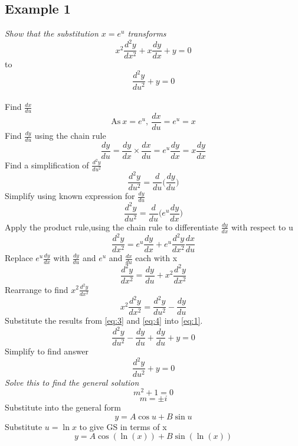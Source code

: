 \documentclass{article}[18pt]
\begin{document}
\subsection{Example 1}
\textit{Show that the substitution $x=e^u$ transforms}
\begin{equation}\label{eq:1}
x^2\frac{d^2y}{dx^2}+x\frac{dy}{dx}+y=0
\end{equation}
to
\begin{equation}\label{eq:2}
\frac{d^2y}{du^2}+y=0
\end{equation}
\\
Find $\frac{dx}{du}$
$$\textrm{As} \ x=e^u, \ \frac{dx}{du}=e^u=x$$
Find $\frac{dy}{du}$ using the chain rule
\begin{equation}\label{eq:3}
\frac{dy}{du}=\frac{dy}{dx}\times\frac{dx}{du}=e^u\frac{dy}{dx}=x\frac{dy}{dx}
\end{equation}
Find a simplification of $\frac{d^2y}{du^2}$
$$\frac{d^2y}{du^2}=\frac{d}{du}\Bigg(\frac{dy}{du}\Bigg)$$
Simplify using known expression for $\frac{dy}{du}$
$$\frac{d^2y}{du^2}=\frac{d}{du}\Bigg(e^u\frac{dy}{dx}\Bigg)$$
Apply the product rule,using the chain rule to differentiate $\frac{dy}{dx}$ with respect to u
$$\frac{d^2y}{dx^2}=e^u\frac{dy}{dx}+e^u\frac{d^2y}{dx^2}\frac{dx}{du}$$
Replace $e^u\frac{dy}{dx}$ with $\frac{dy}{du}$ and $e^u$ and $\frac{dx}{du}$ each with x
$$\frac{d^2y}{dx^2}=\frac{dy}{du}+x^2\frac{d^2y}{dx^2}$$
Rearrange to find $x^2\frac{d^2y}{dx^2}$
\begin{equation}\label{eq:4}
x^2\frac{d^2y}{dx^2}=\frac{d^2y}{du^2}-\frac{dy}{du}
\end{equation}
Substitute the results from \eqref{eq:3} and \eqref{eq:4} into \eqref{eq:1}.
$$\frac{d^2y}{du^2}-\frac{dy}{du}+\frac{dy}{du}+y=0$$
Simplify to find answer
$$\frac{d^2y}{du^2}+y=0$$
\textit{Solve this to find the general solution}
$$m^2+1=0$$
$$m=\pm i$$
Substitute into the general form
$$y=A\cos u+B\sin u$$
Substitute $u=\ln x$ to give GS in terms of x
$$y=A\cos(\ln(x))+B\sin(\ln(x))$$
\newpage
\end{document}
